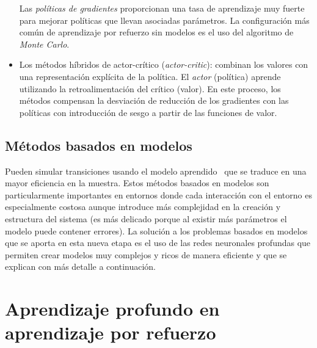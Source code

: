 \begin{itemize}
    Las \textit{políticas de gradientes} \cite{satinder_singh} proporcionan una tasa de aprendizaje muy fuerte para mejorar políticas que llevan asociadas parámetros. La configuración más común de aprendizaje por refuerzo sin modelos es el uso del algoritmo de \textit{Monte Carlo}.\\
    
    \item Los métodos híbridos de actor-crítico (\textit{actor-critic}): combinan los valores con una representación explícita de la política. El \textit{actor} (política) aprende utilizando la retroalimentación del crítico (valor). En este proceso, los métodos compensan la desviación de reducción de los gradientes con las políticas con introducción de sesgo a partir de las funciones de valor.
\end{itemize}


\subsection{Métodos basados en modelos}\label{metodos_basados_en_modelos}

Pueden simular transiciones usando el modelo aprendido~\cite{pieter_abbeel} que se traduce en una mayor eficiencia en la muestra. Estos métodos basados en modelos son particularmente importantes en entornos donde cada interacción con el entorno es especialmente costosa aunque introduce más complejidad en la creación y estructura del sistema (es más delicado porque al existir más parámetros el modelo puede contener errores). La solución a los problemas basados en modelos que se aporta en esta nueva etapa es el uso de las redes neuronales profundas que permiten crear modelos muy complejos y ricos de manera eficiente y que se explican con más detalle a continuación.

\section{Aprendizaje profundo en aprendizaje por refuerzo}  

